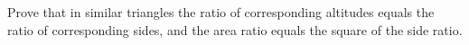 Prove that in similar triangles the ratio of corresponding altitudes equals the ratio of corresponding sides, and the area ratio equals the square of the side ratio.
